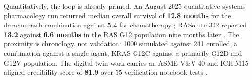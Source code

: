 Quantitatively, the loop is already primed. An August 2025 quantitative systems
pharmacology run returned median overall survival of \textbf{12.8 months} for
the daraxonrasib combination against \textbf{5.4} for chemotherapy
\cite{qspmetpancre}; RASolute 302 reported \textbf{13.2} against \textbf{6.6
months} in the RAS G12 population nine months later \cite{rasolute302}. The
proximity is chronology, not validation: 1000 simulated against 241 enrolled, a
combination against a single agent, KRAS G12C against a primarily G12D and G12V
population. The digital-twin work carries an ASME V\&V 40 and ICH M15 aligned
credibility score of \textbf{81.9} over 55 verification notebook tests
\cite{daraxsims,asmevv40,ichm15}.
